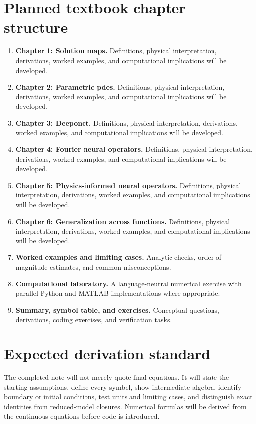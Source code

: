 \documentclass[11pt]{article}
\begin{document}
\section{Planned textbook chapter structure}
\begin{enumerate}[leftmargin=1.8em]
\item \textbf{Chapter 1: Solution maps.} Definitions, physical interpretation, derivations, worked examples, and computational implications will be developed.
\item \textbf{Chapter 2: Parametric pdes.} Definitions, physical interpretation, derivations, worked examples, and computational implications will be developed.
\item \textbf{Chapter 3: Deeponet.} Definitions, physical interpretation, derivations, worked examples, and computational implications will be developed.
\item \textbf{Chapter 4: Fourier neural operators.} Definitions, physical interpretation, derivations, worked examples, and computational implications will be developed.
\item \textbf{Chapter 5: Physics-informed neural operators.} Definitions, physical interpretation, derivations, worked examples, and computational implications will be developed.
\item \textbf{Chapter 6: Generalization across functions.} Definitions, physical interpretation, derivations, worked examples, and computational implications will be developed.
\item \textbf{Worked examples and limiting cases.} Analytic checks, order-of-magnitude estimates, and common misconceptions.
\item \textbf{Computational laboratory.} A language-neutral numerical exercise with parallel Python and MATLAB implementations where appropriate.
\item \textbf{Summary, symbol table, and exercises.} Conceptual questions, derivations, coding exercises, and verification tasks.
\end{enumerate}

\section{Expected derivation standard}
The completed note will not merely quote final equations. It will state the starting assumptions, define every symbol, show intermediate algebra, identify boundary or initial conditions, test units and limiting cases, and distinguish exact identities from reduced-model closures. Numerical formulas will be derived from the continuous equations before code is introduced.
\end{document}
